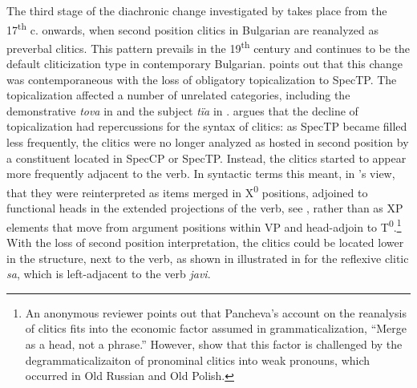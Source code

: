 \documentclass[output=paper,modfonts,newtxmath,hidelinks]{langscibook}
\begin{document}
The third stage of the diachronic change investigated by \citeauthor{pancheva2005} takes place from the 17\textsuperscript{th} c. onwards, when second position clitics in Bulgarian are reanalyzed as preverbal clitics. This pattern prevails in the 19\textsuperscript{th} century and continues to be the default cliticization type in contemporary Bulgarian. \citeauthor{pancheva2005} points out that this change was contemporaneous with the loss of obligatory topicalization to SpecTP. The topicalization affected a number of unrelated categories, including the demonstrative \textit{tova} in  and the subject \textit{tïa} in . \citeauthor{pancheva2005} argues that the decline of topicalization had repercussions for the syntax of clitics: as SpecTP became filled less frequently, the clitics were no longer analyzed as hosted in second position by a constituent located in SpecCP or SpecTP. Instead, the clitics started to appear more frequently adjacent to the verb. In syntactic terms this meant, in \citeauthor{pancheva2005}’s view, that they were reinterpreted as items merged in X\textsuperscript{0} positions, adjoined to functional heads in the extended projections of the verb, see , rather than as XP elements that move from argument positions within VP and head-adjoin to T\textsuperscript{0}.\footnote{\label{11:fn2}An anonymous reviewer points out that Pancheva’s account on the reanalysis of clitics fits into the economic factor assumed in grammaticalization, “Merge as a head, not a phrase.” However, \citet{jung-migdalski2015} show that this factor is challenged by the degrammaticalizaiton of pronominal clitics into weak pronouns, which occurred in Old Russian and Old Polish.} With the loss of second position interpretation, the clitics could be located lower in the structure, next to the verb, as shown in illustrated in  for the reflexive clitic \textit{sa}, which is left-adjacent to the verb \textit{javi}. 

\ea \label{11:ex5}
	 \label{11:ex5a}
	 \label{11:ex5b}
	\z
\z
\end{document}
